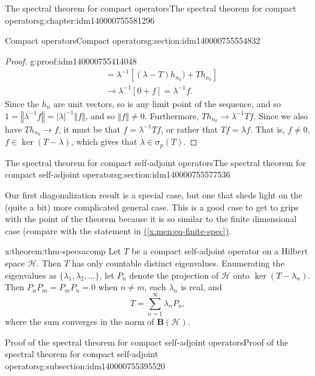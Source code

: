\documentclass[oneside,10pt,]{book}
\newcommand{\xreffont}{\relax}
\numberwithin{equation}{section}
\newcommand{\hilbert}{\mathcal{H}}
\newcommand{\BH}{\mathbf{B}(\mathcal{H})}
\newcommand{\abs}[1]{\left\vert#1\right\vert}
\newcommand{\norm}[1]{\left\Vert#1\right\Vert}
\newcommand{\inv}{^{-1}}
\newcommand\la{\lambda}
\numberwithin{equation}{section}
\newcommand{\amp}{&}
\begin{document}
\begin{chapterptx}{The spectral theorem for compact operators}{}{The spectral theorem for compact operators}{}{}{g:chapter:idm140000755581296}
\begin{sectionptx}{Compact operators}{}{Compact operators}{}{}{g:section:idm140000755554832}
\begin{proof}{}{g:proof:idm140000755414048}
\begin{align*}
\amp=\la\inv [(\la - T) h_{n_k}) + T h_{n_k}] \\
\amp\to \la\inv[0 + f] = \la\inv f.
\end{align*}
Since the \(h_n\) are unit vectors, so is any limit point of the sequence, and so \(1 = \norm{\la\inv f} = \abs{\la}\inv \norm{f}\), and so \(\norm{f} \neq 0\). Furthermore, \(T h_{n_k} \to \la\inv Tf\). Since we also have \(T h_{n_k} \to f\), it must be that \(f = \la\inv T f\), or rather that \(T f = \la f\). That is, \(f\neq 0\), \(f \in \ker(T - \la)\), which gives that \(\la \in \sigma_p(T)\).%
\end{proof}
\end{sectionptx}
%
%
\typeout{************************************************}
\typeout{************************************************}
%
\begin{sectionptx}{The spectral theorem for compact self-adjoint operators}{}{The spectral theorem for compact self-adjoint operators}{}{}{g:section:idm140000755577536}
\begin{introduction}{}%
Our first diagonalization result is a special case, but one that sheds light on the (quite a bit) more complicated general case. This is a good case to get to grips with the point of the theorem because it is so similar to the finite dimensional case (compare with the statement in \hyperref[x:men:eq-finite-spec]{({\xreffont\ref{x:men:eq-finite-spec}})}.%
\begin{theorem}{}{}{x:theorem:thm-specsacomp}%
Let \(T\) be a compact self-adjoint operator on a Hilbert space \(\hilbert\). Then \(T\) has only countable distinct eigenvalues. Enumerating the eigenvalues as \(\{\la_1, \la_2, \ldots\}\), let \(P_n\) denote the projection of \(\hilbert\) onto \(\ker(T - \la_n)\). Then \(P_nP_m = P_m P_n = 0\) when \(n \neq m\), each \(\la_n\) is real, and%
\begin{equation*}
T = \sum_{n=1}^\infty \la_n P_n,
\end{equation*}
where the sum converges in the norm of \(\BH\).%
\end{theorem}
\end{introduction}%
%
%
\typeout{************************************************}
\typeout{************************************************}
%
\begin{subsectionptx}{Proof of the spectral theorem for compact self-adjoint operators}{}{Proof of the spectral theorem for compact self-adjoint operators}{}{}{g:subsection:idm140000755395520}

\end{subsectionptx}
\end{sectionptx}
\end{chapterptx}
\end{document}
